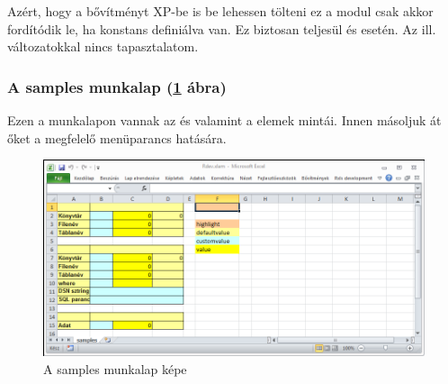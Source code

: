 Azért, hogy a bővítményt  XP-be is be lehessen tölteni ez a modul
csak akkor fordítódik le, ha  konstans definiálva van. Ez
biztosan teljesül  és  esetén. 
Az  ill.  változatokkal nincs tapasztalatom.

\subsubsection{A samples munkalap (\ref{fig:6.1} ábra)}

Ezen a munkalapon vannak az  és 
valamint a  elemek mintái. Innen másoljuk át őket a megfelelő
menüparancs hatására. 
\begin{figure}[h]
  \centering
  \includegraphics{images/samples}
  \caption{A samples munkalap képe}
  \label{fig:6.1}
\end{figure}


\endinput



